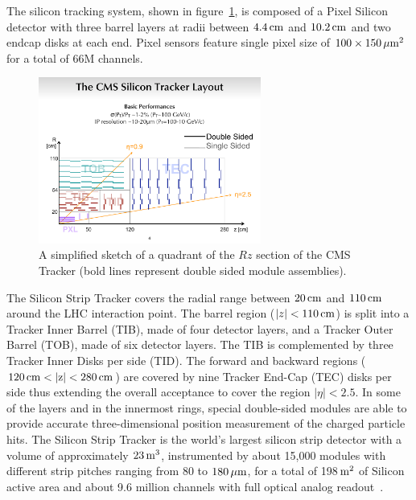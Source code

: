 The silicon tracking system, shown in figure~\ref{fig:tracker}, is composed of a Pixel
Silicon detector with three barrel layers at radii between $4.4\rm \, cm$
and $10.2\rm \, cm$ and two endcap disks at each end. Pixel sensors feature single pixel size
of $100\times150\, \mu \rm m^2$ for a total of 66M channels.  
\begin{figure}[t]
\includegraphics*[width=0.65\textwidth]{figs/layout_rz.pdf}\hspace{0.02\textwidth}%
\begin{minipage}[b]{0.33\textwidth}\caption{\label{fig:tracker}A simplified
    sketch of a quadrant of the $Rz$ section of the CMS Tracker (bold
    lines represent double sided module assemblies).}
\end{minipage}
\end{figure}
The Silicon Strip Tracker
covers the radial range between $20\rm \, cm$ and $110\rm \, cm$ around the LHC
interaction point. The barrel region ($| z |  < 110\rm \, cm$) is split into
a Tracker Inner Barrel (TIB), made of four detector layers, and a
Tracker Outer Barrel (TOB), made of six detector layers. The TIB is
complemented by three Tracker Inner Disks 
per side (TID). The forward and backward
regions ($120\rm \, cm < |z| < 280\rm \, cm$) are covered by nine Tracker
End-Cap (TEC) disks per side
thus extending the overall acceptance to cover the region
$|\eta|<2.5$. In some of the layers and in the innermost 
rings, special double-sided modules
are able to provide accurate three-dimensional position measurement of the charged
particle hits.  The Silicon Strip Tracker is the world's largest silicon
strip detector with a volume of approximately $23\rm \, m^3$, instrumented by about 15,000 modules
with different strip pitches ranging from 80 to $180\, \mu \rm m$, for a total
of 198$\rm \, m^2$ of Silicon active area and about 9.6 million channels with full optical analog readout~\cite{cms}\cite{TkTDR}\cite{TkTDRadd}.

